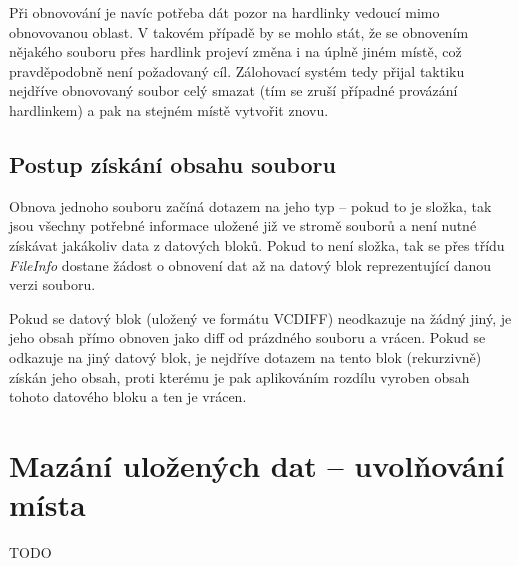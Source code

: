Při obnovování je navíc potřeba dát pozor na hardlinky vedoucí mimo obnovovanou
oblast. V takovém případě by se mohlo stát, že se obnovením nějakého souboru
přes hardlink projeví změna i na úplně jiném místě, což pravděpodobně není
požadovaný cíl. Zálohovací systém tedy přijal taktiku nejdříve obnovovaný soubor
celý smazat (tím se zruší případné provázání hardlinkem) a pak na stejném místě
vytvořit znovu.

\subsection{Postup získání obsahu souboru}

Obnova jednoho souboru začíná dotazem na jeho typ -- pokud to je složka, tak
jsou všechny potřebné informace uložené již ve stromě souborů a není nutné
získávat jakákoliv data z datových bloků. Pokud to není složka, tak se přes
třídu {\it FileInfo} dostane žádost o obnovení dat až na datový blok
reprezentující danou verzi souboru.

Pokud se datový blok (uložený ve formátu \gls{VCDIFF}) neodkazuje na žádný jiný,
je jeho obsah přímo obnoven jako diff od prázdného souboru a vrácen. Pokud se
odkazuje na jiný datový blok, je nejdříve dotazem na tento blok (rekurzivně)
získán jeho obsah, proti kterému je pak aplikováním rozdílu vyroben obsah tohoto
datového bloku a ten je vrácen.

\section{Mazání uložených dat -- uvolňování místa}

TODO
